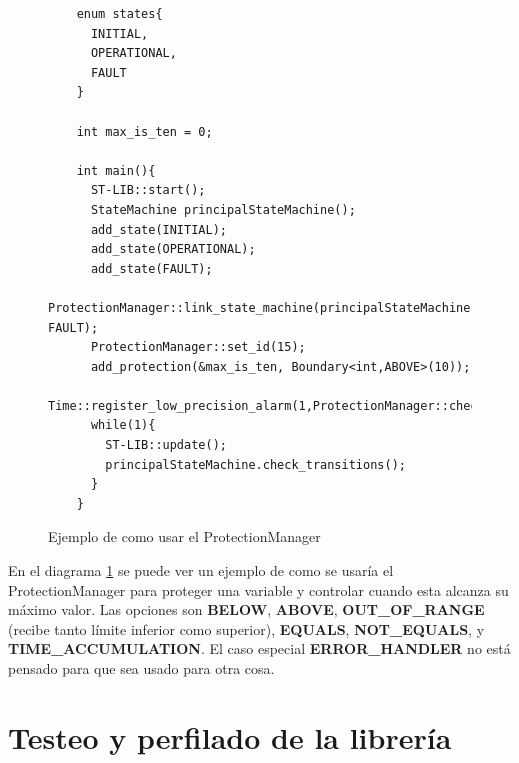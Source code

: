 \documentclass{report}
\begin{document}
\begin{figure}[h]
  \begin{lstlisting}
    enum states{
      INITIAL,
      OPERATIONAL,
      FAULT
    }

    int max_is_ten = 0;

    int main(){
      ST-LIB::start();
      StateMachine principalStateMachine();
      add_state(INITIAL);
      add_state(OPERATIONAL);
      add_state(FAULT);
      ProtectionManager::link_state_machine(principalStateMachine, FAULT);
      ProtectionManager::set_id(15);
      add_protection(&max_is_ten, Boundary<int,ABOVE>(10));
      Time::register_low_precision_alarm(1,ProtectionManager::check_protections());
      while(1){
        ST-LIB::update();
        principalStateMachine.check_transitions();
      }
    }
  \end{lstlisting}
  \caption{Ejemplo de como usar el ProtectionManager}
  \label{ProtectionManagerCode}
\end{figure}
\par \vspace{0.3cm}
En el diagrama \ref{ProtectionManagerCode} se puede ver un ejemplo de como se usaría el ProtectionManager para proteger una variable y controlar cuando esta alcanza su máximo valor. Las opciones son \textbf{BELOW}, \textbf{ABOVE}, \textbf{OUT\_OF\_RANGE} (recibe tanto límite inferior como superior), \textbf{EQUALS}, \textbf{NOT\_EQUALS}, y \textbf{TIME\_ACCUMULATION}. El caso especial \textbf{ERROR\_HANDLER} no está pensado para que sea usado para otra cosa.



\newpage

\section{Testeo y perfilado de la librería}
\end{document}
